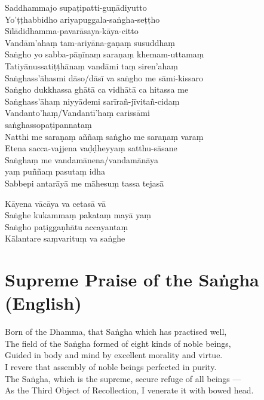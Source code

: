 \begin{leader}
\end{leader}

Saddhammajo supaṭipatti-guṇādiyutto\\
Yo'ṭṭhabbidho ariyapuggala-saṅgha-seṭṭho\\
Sīlādidhamma-pavarāsaya-kāya-citto\\
Vandām'ahaṃ tam-ariyāna-gaṇaṃ susuddhaṃ\\
Saṅgho yo sabba-pāṇīnaṃ saraṇaṃ khemam-uttamaṃ\\
Tatiyānussatiṭṭhānaṃ vandāmi taṃ siren'ahaṃ\\
Saṅghass'āhasmi dāso/dāsī va saṅgho me sāmi-kissaro\\
Saṅgho dukkhassa ghātā ca vidhātā ca hitassa me\\
Saṅghass'āhaṃ niyyādemi sarīrañ-jīvitañ-cidaṃ\\
Vandanto'haṃ/Vandantī'haṃ carissāmi\\
\vin saṅghassopaṭipannataṃ\\
Natthi me saraṇaṃ aññaṃ saṅgho me saraṇaṃ varaṃ\\
Etena sacca-vajjena vaḍḍheyyaṃ satthu-sāsane\\
Saṅghaṃ me vandamānena/vandamānāya\\
\vin yaṃ puññaṃ pasutaṃ idha\\
Sabbepi antarāyā me māhesuṃ tassa tejasā


Kāyena vācāya va cetasā vā\\
Saṅghe kukammaṃ pakataṃ mayā yaṃ\\
Saṅgho paṭiggaṇhātu accayantaṃ\\
Kālantare saṃvarituṃ va saṅghe

\section*{Supreme Praise of the Saṅgha (English)}

\begin{leader}
\end{leader}

Born of the Dhamma, that Saṅgha which has practised well,\\
The field of the Saṅgha formed of eight kinds of noble beings,\\
Guided in body and mind by excellent morality and virtue.\\
I revere that assembly of noble beings perfected in purity.\\
The Saṅgha, which is the supreme, secure refuge of all beings ---\\
As the Third Object of Recollection, I venerate it with bowed head.


